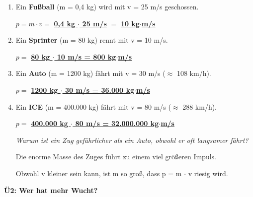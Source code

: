 \documentclass[11pt,a4paper]{article}
\newcommand{\lsg}[1]{\textcolor{loesung}{\underline{\textbf{#1}}}}
\newcommand{\lsgtext}[1]{\textcolor{loesung}{#1}}
\begin{document}
\begin{enumerate}[label=\alph*), leftmargin=*, itemsep=12pt]

\item Ein \textbf{Fußball} (m = 0,4 kg) wird mit v = 25 m/s geschossen.

\vspace{3pt}
$p = m \cdot v = $ \lsg{0,4 kg $\cdot$ 25 m/s} $= $ \lsg{10 kg$\cdot$m/s}

\item Ein \textbf{Sprinter} (m = 80 kg) rennt mit v = 10 m/s.

\vspace{3pt}
$p = $ \lsg{80 kg $\cdot$ 10 m/s = 800 kg$\cdot$m/s}

\item Ein \textbf{Auto} (m = 1200 kg) fährt mit v = 30 m/s ($\approx$ 108 km/h).

\vspace{3pt}
$p = $ \lsg{1200 kg $\cdot$ 30 m/s = 36.000 kg$\cdot$m/s}

\item Ein \textbf{ICE} (m = 400.000 kg) fährt mit v = 80 m/s ($\approx$ 288 km/h).

\vspace{3pt}
$p = $ \lsg{400.000 kg $\cdot$ 80 m/s = 32.000.000 kg$\cdot$m/s}

\vspace{5pt}
\textit{Warum ist ein Zug gefährlicher als ein Auto, obwohl er oft langsamer fährt?}

\vspace{3pt}
\lsgtext{Die enorme Masse des Zuges führt zu einem viel größeren Impuls.}

\lsgtext{Obwohl v kleiner sein kann, ist m so groß, dass p = m $\cdot$ v riesig wird.}

\end{enumerate}

\newpage


\textbf{Ü2: Wer hat mehr Wucht?}

\vspace{3mm}
\end{document}
